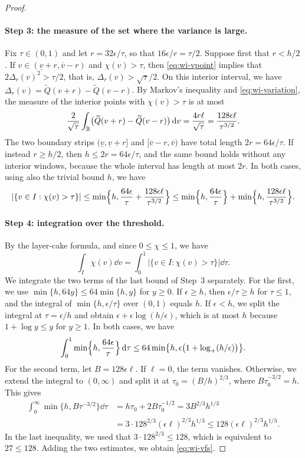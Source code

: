 \begin{proof}
\paragraph{Step 3: the measure of the set where the variance is large.}
Fix $\tau\in(0,1)$ and let $r=32\epsilon/\tau$, so that
$16\epsilon/r=\tau/2$. Suppose first that $r<h/2$. If
$v\in(\underline v+r,\overline v-r)$ and $\chi(v)>\tau$, then
\eqref{eq:wi-vpoint} implies that $2\Delta_r(v)^2>\tau/2$, that is,
$\Delta_r(v)>\sqrt\tau/2$. On this interior interval, we have
$\Delta_r(v)=\widetilde Q(v+r)-\widetilde Q(v-r)$. By Markov's
inequality and \eqref{eq:wi-variation}, the measure of the interior
points with $\chi(v)>\tau$ is at most
\[
 \frac2{\sqrt\tau}\int_\mathbb R\bigl(\widetilde Q(v+r)-\widetilde Q(v-r)\bigr)\,\mathrm d v
 =\frac{4r\ell}{\sqrt\tau}=\frac{128\epsilon\ell}{\tau^{3/2}}.
\]
The two boundary strips $(\underline v,\underline v+r]$ and
$[\overline v-r,\overline v)$ have total length $2r=64\epsilon/\tau$. If
instead $r\ge h/2$, then $h\le2r=64\epsilon/\tau$, and the same bound
holds without any interior windows, because the whole interval has
length at most $2r$. In both cases,
using also the trivial bound $h$, we have
\[
 |\{v\in I:\chi(v)>\tau\}|
 \le\min\Bigl\{h,\frac{64\epsilon}{\tau}
                    +\frac{128\epsilon\ell}{\tau^{3/2}}\Bigr\}
 \le\min\Bigl\{h,\frac{64\epsilon}{\tau}\Bigr\}
   +\min\Bigl\{h,\frac{128\epsilon\ell}{\tau^{3/2}}\Bigr\}.
\]

\paragraph{Step 4: integration over the threshold.}
By the layer-cake formula, and since $0\le\chi\le1$, we have
\[
 \int_I\chi(v)\dd v=\int_0^1|\{v\in I:\chi(v)>\tau\}|\dd\tau .
\]
We integrate the two terms of the last bound of Step~3 separately. For
the first, we use $\min\{h,64y\}\le64\min\{h,y\}$ for $y\ge0$. If
$\epsilon\ge h$, then $\epsilon/\tau\ge h$ for $\tau\le1$, and the
integral of $\min\{h,\epsilon/\tau\}$ over $(0,1)$ equals $h$. If
$\epsilon<h$, we split the integral at $\tau=\epsilon/h$ and obtain
$\epsilon+\epsilon\log(h/\epsilon)$, which is at most $h$ because
$1+\log y\le y$ for $y\ge1$. In both cases, we have
\[
 \int_0^1\min\Bigl\{h,\frac{64\epsilon}\tau\Bigr\}\,\mathrm d\tau
 \le64\min\bigl\{h,\epsilon\bigl(1+\log_+(h/\epsilon)\bigr)\bigr\}.
\]
For the second term, let $B=128\epsilon\ell$. If $\ell=0$, the term
vanishes. Otherwise, we extend the integral to $(0,\infty)$ and split
it at $\tau_0=(B/h)^{2/3}$, where $B\tau_0^{-3/2}=h$. This gives
\[
 \begin{aligned}
 \int_0^\infty\min\{h,B\tau^{-3/2}\}\dd\tau
 &=h\tau_0+2B\tau_0^{-1/2}=3B^{2/3}h^{1/3}\\
 &=3\cdot128^{2/3}(\epsilon\ell)^{2/3}h^{1/3}
 \le128(\epsilon\ell)^{2/3}h^{1/3}.
 \end{aligned}
\]
In the last inequality, we used that $3\cdot128^{2/3}\le128$, which is
equivalent to $27\le128$. Adding the two estimates, we obtain
\eqref{eq:wi-vfs}.
\end{proof}

